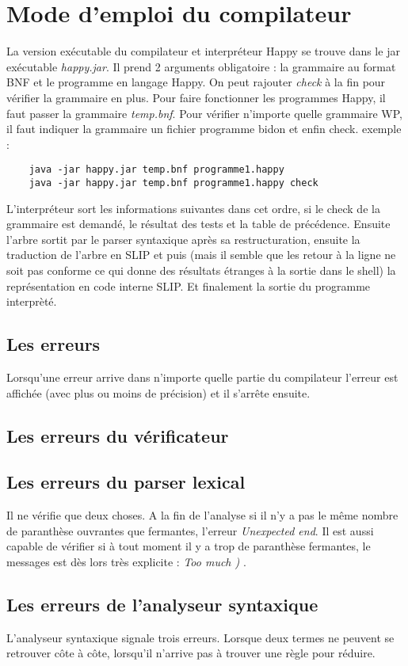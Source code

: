 \chapter{Mode d'emploi du compilateur}
La version exécutable du compilateur et interpréteur Happy se trouve dans le jar exécutable \textit{happy.jar}.
Il prend 2 arguments obligatoire : la grammaire au format BNF et le programme en langage Happy. On peut rajouter \textit{check} à la fin pour vérifier la grammaire en plus.
Pour faire fonctionner les programmes Happy, il faut passer la grammaire \textit{temp.bnf}. Pour vérifier n'importe quelle grammaire WP, il faut indiquer la grammaire
un fichier programme bidon et enfin check.
exemple : \begin{verbatim}
    java -jar happy.jar temp.bnf programme1.happy 
    java -jar happy.jar temp.bnf programme1.happy check
          \end{verbatim}

L'interpréteur sort les informations suivantes dans cet ordre, si le check de la grammaire est demandé, le résultat des tests et la table de précédence.
Ensuite l'arbre sortit par le parser syntaxique après sa restructuration, ensuite la traduction de l'arbre en SLIP et puis (mais il semble que
les retour à la ligne ne soit pas conforme ce qui donne des résultats étranges à la sortie dans le shell) la représentation en code interne SLIP. Et finalement
la sortie du programme interprèté. 


\section{Les erreurs}
Lorsqu'une erreur arrive dans n'importe quelle partie du compilateur l'erreur est affichée (avec plus ou moins de précision) et il s'arrête ensuite.
\section{Les erreurs du vérificateur}
  

\section{Les erreurs du parser lexical}
  Il ne vérifie que deux choses. A la fin de l'analyse si il n'y a pas le même nombre de paranthèse ouvrantes que fermantes, l'erreur \textit{Unexpected end}.
  Il est aussi capable de vérifier si à tout moment il y a trop de paranthèse fermantes, le messages est dès lors très explicite : \textit{Too much ) }.
\section{Les erreurs de l'analyseur syntaxique}
  L'analyseur syntaxique signale trois erreurs. Lorsque deux termes ne peuvent se retrouver côte à côte, lorsqu'il n'arrive pas à trouver une règle pour réduire.


